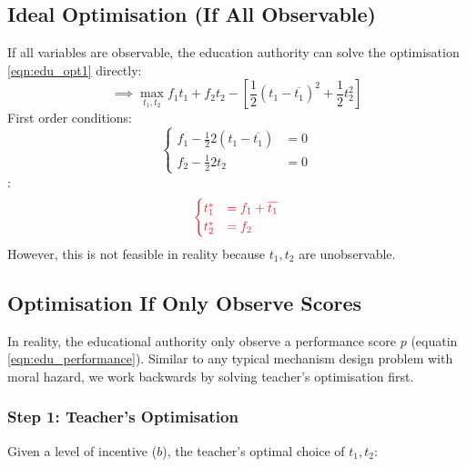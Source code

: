     \subsection{Ideal Optimisation (If All Observable)}
        
        If all variables are observable, the education authority can solve the optimisation \ref{eqn:edu_opt1} directly:
        \begin{equation*}
            \implies \max_{t_1,t_2} f_1t_1 + f_2t_2 - \left[ \frac{1}{2}(t_1-\overline{t_1})^2+\frac{1}{2}t_2^2 \right]
        \end{equation*}
        First order conditions:
        \begin{equation*}
            \begin{cases}
                    f_1 - \frac{1}{2} 2(t_1 - \overline{t_1}) &= 0\\
                    f_2 - \frac{1}{2} 2t_2 &= 0
            \end{cases}
        \end{equation*}
        :
        \begin{equation*}
            \color{Red}
            \begin{cases}
                t_1^* &= f_1 + \overline{t_1}\\
                t_2^* &= f_2
            \end{cases}
        \end{equation*}
        However, this is not feasible in reality because $t_1,t_2$ are unobservable.
    
    \subsection{Optimisation If Only Observe Scores}
    
        In reality, the educational authority only observe a performance score $p$ (equatin \ref{eqn:edu_performance}). Similar to any typical mechanism design problem with moral hazard, we work backwards by solving teacher's optimisation first.
        
        \subsubsection{Step 1: Teacher's Optimisation}
        
            Given a level of incentive ($b$), the teacher's optimal choice of $t_1,t_2$:

